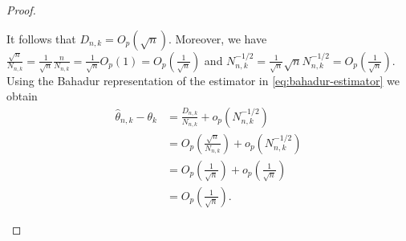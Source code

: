 \begin{proof}
\begin{enumerate}[label=(\roman*)]
		It follows that \( D_{n,k} = O_p(\sqrt{n}) \). Moreover, we have \(\frac{\sqrt{n}}{N_{n,k}}  =\frac{1}{\sqrt{n}}\frac{n}{N_{n,k}} = \frac{1}{\sqrt{n}} O_p(1) = O_p\left(\frac{1}{\sqrt{n}}\right)\) and \(N_{n,k}^{-1/2} = \frac{1}{\sqrt{n}}\sqrt{n}N_{n,k}^{-1/2} = O_p\left(\frac{1}{\sqrt{n}}\right)\). Using the Bahadur representation of the estimator in \eqref{eq:bahadur-estimator} we obtain
			\begin{align*}
				\hat{\theta}_{n,k} - \theta_k
				&=
				\frac{D_{n,k}}{N_{n,k}}
				+ o_p\!\left(N_{n,k}^{-1/2}\right) \\
				&=
				O_p\!\left(\frac{\sqrt{n}}{N_{n,k}}\right)
				+ o_p\!\left(N_{n,k}^{-1/2}\right) \\
				&=
				O_p\!\left(\frac{1}{\sqrt{n}}\right) + o_p\!\left(\frac{1}{\sqrt{n}}\right)\\
				&=
				O_p\!\left(\frac{1}{\sqrt{n}}\right).
		\end{align*}
		

\end{enumerate}
\end{proof}
